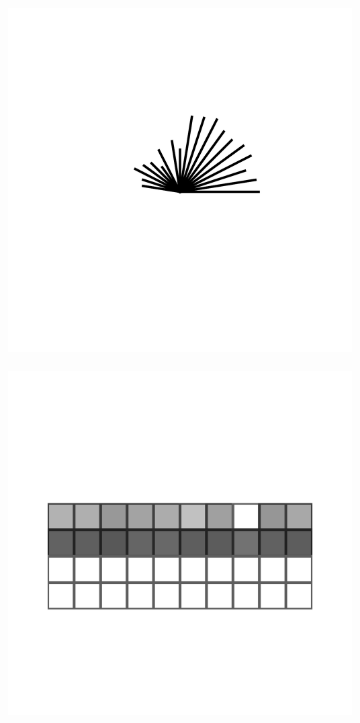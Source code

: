 \begin{figure}[t]
\begin{subfigure}{0.23\linewidth}
\caption{}
\label{subfig:pie}
\end{subfigure}%
\hspace*{0.01\linewidth}%
\begin{subfigure}{0.23\linewidth}
\centering
\includegraphics[width=\linewidth,clip,trim={2.4cm 4cm 1.7cm 4cm}]{infuse/g2}
\caption{}
\label{subfig:star}
\end{subfigure}%
\hspace*{0.01\linewidth}%
\begin{subfigure}{0.23\linewidth}
\centering
\includegraphics[width=\linewidth,clip,trim={2.4cm 4cm 1.7cm 4cm}]{infuse/g3}

\end{subfigure}
\end{figure}
